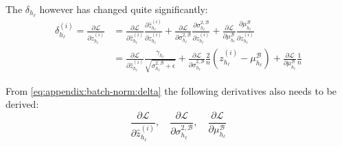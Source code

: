 The $\delta_{h_\ell}$ however has changed quite significantly:
\begin{equation}
\begin{aligned}
\delta_{h_\ell}^{(i)} = \frac{\partial \mathcal{L}}{\partial z_{h_\ell}^{(i)}} &= \frac{\partial \mathcal{L}}{\partial \hat{z}_{h_\ell}^{(i)}} \frac{\partial \hat{z}_{h_\ell}^{(i)}}{\partial z_{h_\ell}^{(i)}} + \frac{\partial \mathcal{L}}{\partial \sigma_{h_\ell}^{2,\mathcal{B}}} \frac{\partial \sigma_{h_\ell}^{2,\mathcal{B}}}{\partial z_{h_\ell}^{(i)}} + \frac{\partial \mathcal{L}}{\partial \mu_{h_\ell}^{\mathcal{B}}} \frac{\partial \mu_{h_\ell}^{\mathcal{B}}}{\partial z_{h_\ell}^{(i)}} \\
&= \frac{\partial \mathcal{L}}{\partial \hat{z}_{h_\ell}^{(i)}} \frac{\gamma_{h_\ell}}{\sqrt{\sigma_{h_\ell}^{2, \mathcal{B}} + \epsilon}} + \frac{\partial \mathcal{L}}{\partial \sigma_{h_\ell}^{2,\mathcal{B}}} \frac{2}{n}\left(z_{h_\ell}^{(i)} - \mu_{h_\ell}^{\mathcal{B}}\right) + \frac{\partial \mathcal{L}}{\partial \mu_{h_\ell}^{\mathcal{B}}} \frac{1}{n}
\end{aligned}
\label{eq:appendix:batch-norm:delta}
\end{equation}

From \eqref{eq:appendix:batch-norm:delta} the following derivatives also needs to be derived:
\begin{equation}
\frac{\partial \mathcal{L}}{\partial \hat{z}_{h_\ell}^{(i)}}, \quad \frac{\partial \mathcal{L}}{\partial \sigma_{h_\ell}^{2,\mathcal{B}}}, \quad \frac{\partial \mathcal{L}}{\partial \mu_{h_\ell}^{\mathcal{B}}}
\end{equation}

